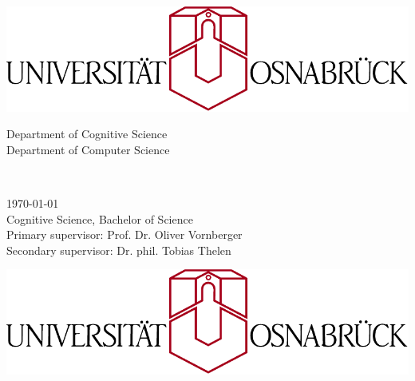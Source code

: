 \begin{titlepage}
  \begin{addmargin}[-1cm]{-3cm}
    \begin{center}
      \large
      \hfill

      \includegraphics[width=\textwidth]{img/uos2} \\
      \bigskip

      Department of Cognitive Science\\ \medskip
      Department of Computer Science

      \vfill

      \Large
       \\
      \bigskip

      \begingroup
        \LARGE
        \color{Maroon}
      \endgroup
      \bigskip

      \Large

      \vfill
      \vfill
    \end{center}

    \today \\
    Cognitive Science, Bachelor of Science \\
    Primary supervisor: Prof. Dr. Oliver Vornberger \\
    Secondary supervisor: Dr. phil. Tobias Thelen \\
  \end{addmargin}
  \cleardoublepage
  \begin{addmargin}[-1cm]{-3cm}
    \begin{center}
      \large
      \hfill

      \includegraphics[width=\textwidth]{img/uos2} \\
      \bigskip


\end{center}
\end{addmargin}
\end{titlepage}
